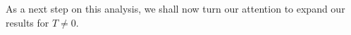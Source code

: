 \documentclass[plainsections,a0]{sciposterlocal}
\begin{document}
\begin{multicols}{2}
As a next step on this analysis, we shall now turn our attention to expand our results for $T \neq 0$.

{ \footnotesize

}

\end{multicols}
\end{document}
